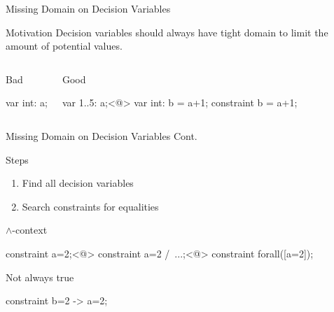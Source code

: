 \documentclass[aspectratio=169]{beamer} %
\begin{document}
\begin{frame}[fragile]{Missing Domain on Decision Variables}
  \begin{block}{Motivation}
    Decision variables should \alert{always} have tight domain to limit the amount of potential values.
  \end{block}

  \pause
  \begin{columns}[t,onlytextwidth]
  \begin{exampleblock}{Bad}
    \begin{mznno}
var int: a;
    \end{mznno}
  \end{exampleblock}

  \begin{exampleblock}{Good}
    \begin{mznno}
var 1..5: a;<@\pause@>
var int: b = a+1;
constraint b = a+1;
    \end{mznno}
  \end{exampleblock}
  \end{columns}
\end{frame}

\begin{frame}[fragile]{Missing Domain on Decision Variables Cont.}
  \begin{block}{Steps}
    \begin{enumerate}
      \item Find all decision variables
      \item Search constraints for equalities
    \end{enumerate}
  \end{block}

  \pause
  \begin{block}{$\land$-context}
    \begin{mznno}
constraint a=2;<@\pause@>
constraint a=2 /\ ...;<@\pause@>
constraint forall([a=2]);
    \end{mznno}
  \end{block}

  \pause
  \begin{alertblock}{Not always true}
    \begin{mznno}
constraint b=2 -> a=2;
    \end{mznno}
  \end{alertblock}
\end{frame}
\end{document}
